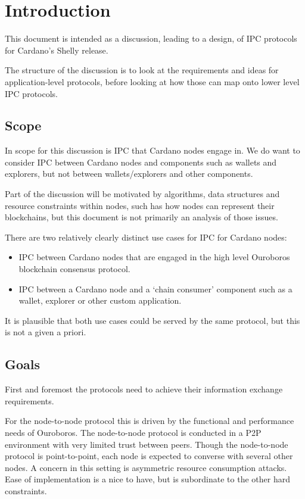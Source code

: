 \documentclass{article}
\theoremstyle{definition}{
  \newtheorem{lemma}{Lemma}[section] %
  \newtheorem{definition}[lemma]{Definition}
}
\theoremstyle{theorem}{
  \newtheorem{invariant}[lemma]{Invariant}
  \newtheorem{proofobligation}[lemma]{Proof Obligation}
}
\numberwithin{equation}{lemma}
\begin{document}
\section{Introduction}

This document is intended as a discussion, leading to a design, of IPC
protocols for Cardano's Shelly release.

The structure of the discussion is to look at the requirements and ideas for
application-level protocols, before looking at how those can map onto lower
level IPC protocols.

\subsection{Scope}

In scope for this discussion is IPC that Cardano nodes engage in. We do want
to consider IPC between Cardano nodes and components such as wallets and
explorers, but not between wallets/explorers and other components.

Part of the discussion will be motivated by algorithms, data structures and
resource constraints within nodes, such has how nodes can represent their
blockchains, but this document is not primarily an analysis of those issues.

There are two relatively clearly distinct use cases for IPC for Cardano nodes:
\begin{itemize}
\item IPC between Cardano nodes that are engaged in the high level Ouroboros
      blockchain consensus protocol.
\item IPC between a Cardano node and a `chain consumer' component such as a
      wallet, explorer or other custom application.
\end{itemize}

It is plausible that both use cases could be served by the same protocol, but
this is not a given a priori.

\subsection{Goals}

First and foremost the protocols need to achieve their information exchange
requirements.

For the node-to-node protocol this is driven by the functional and performance
needs of Ouroboros. The node-to-node protocol is conducted in a P2P environment
with very limited trust between peers. Though the node-to-node protocol is
point-to-point, each node is expected to converse with several other nodes. A
concern in this setting is asymmetric resource consumption attacks. Ease of
implementation is a nice to have, but is subordinate to the other hard
constraints.
\end{document}
